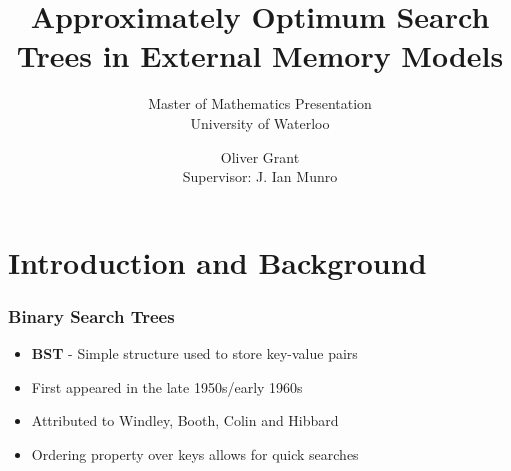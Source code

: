 \documentclass{beamer}
\title{Approximately Optimum Search
Trees in External Memory Models}
\subtitle{Master of Mathematics Presentation \\ University of Waterloo}
\author{Oliver Grant \\
Supervisor: J. Ian Munro}
\theoremstyle{plain}
\begin{document}
 \date{}
\begin{frame}
  \titlepage
\end{frame}


\section{Introduction and Background}

\begin{frame} \frametitle{Binary Search Trees}

\begin{itemize}

\item \textbf{BST} - Simple structure used to store key-value pairs

\item First appeared in the late 1950s/early 1960s

\item Attributed to Windley, Booth, Colin and Hibbard \cite{windley1960trees, booth1960efficiency, hibbard1962some}

\item Ordering property over keys allows for quick searches

\end{itemize}

\end{frame}
\end{document}
